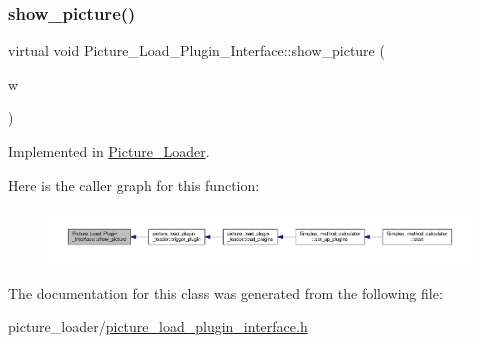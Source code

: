 \subsubsection{\texorpdfstring{show\+\_\+picture()}{show\_picture()}\hspace{0.1cm}{\footnotesize\ttfamily [2/2]}}
{\footnotesize\ttfamily virtual void Picture\+\_\+\+Load\+\_\+\+Plugin\+\_\+\+Interface\+::show\+\_\+picture (\begin{DoxyParamCaption}\item[{Q\+Main\+Window $\ast$}]{w }\end{DoxyParamCaption})\hspace{0.3cm}{\ttfamily [pure virtual]}}



Implemented in \hyperlink{classPicture__Loader_af4127aaea7066112b2368adda46a82b0}{Picture\+\_\+\+Loader}.

Here is the caller graph for this function\+:\nopagebreak
\begin{figure}[H]
\begin{center}
\leavevmode
\includegraphics[width=350pt]{classPicture__Load__Plugin__Interface_a2d90e62b277854046ebcdac8ffadf0d5_icgraph}
\end{center}
\end{figure}


The documentation for this class was generated from the following file\+:\begin{DoxyCompactItemize}
\item 
picture\+\_\+loader/\hyperlink{picture__loader_2picture__load__plugin__interface_8h}{picture\+\_\+load\+\_\+plugin\+\_\+interface.\+h}\end{DoxyCompactItemize}
